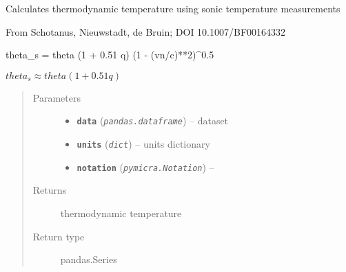 \documentclass[a4paper,10pt,oneside]{sphinxmanual}
\begin{document}
\begin{fulllineitems}
\label{pymicra:pymicra.physics.theta_from_theta_s}
Calculates thermodynamic temperature using sonic temperature measurements

From Schotanus, Nieuwstadt, de Bruin; DOI 10.1007/BF00164332

theta\_s = theta (1 + 0.51 q) (1 - (vn/c)**2)\textasciicircum{}0.5

\(theta_s \approx theta (1 + 0.51 q)\)
\begin{quote}\begin{description}
\item[{Parameters}] \leavevmode\begin{itemize}
\item {} 
\textbf{\texttt{data}} (\emph{\texttt{pandas.dataframe}}) -- dataset

\item {} 
\textbf{\texttt{units}} (\emph{\texttt{dict}}) -- units dictionary

\item {} 
\textbf{\texttt{notation}} (\emph{\texttt{pymicra.Notation}}) -- 

\end{itemize}

\item[{Returns}] \leavevmode
thermodynamic temperature

\item[{Return type}] \leavevmode
pandas.Series

\end{description}\end{quote}

\end{fulllineitems}

\end{document}
